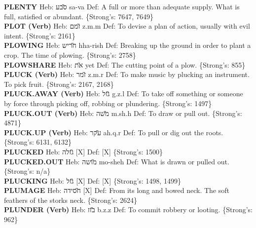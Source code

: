 {\textbf{PLENTY} Heb: {\large\H סבע} sa-va Def: A full or more than adequate supply. What is full, satisfied or abundant. \{Strong's: 7647, 7649\}\hfill{}\\

\textbf{PLOT (Verb)} Heb: {\large\H זמם} z.m.m Def: To devise a plan of action, usually with evil intent. \{Strong's: 2161\}\hfill{}\\

\textbf{PLOWING} Heb: {\large\H חריש} hha-rish Def: Breaking up the ground in order to plant a crop. The time of plowing. \{Strong's: 2758\}\hfill{}\\

\textbf{PLOWSHARE} Heb: {\large\H את} yet Def: The cutting point of a plow. \{Strong's: 855\}\hfill{}\\

\textbf{PLUCK (Verb)} Heb: {\large\H זמר} z.m.r Def: To make music by plucking an instrument. To pick fruit. \{Strong's: 2167, 2168\}\hfill{}\\

\textbf{PLUCK.AWAY (Verb)} Heb: {\large\H גזל} g.z.l Def: To take off something or someone by force through picking off, robbing or plundering. \{Strong's: 1497\}\hfill{}\\

\textbf{PLUCK.OUT (Verb)} Heb: {\large\H משה} m.sh.h Def: To draw or pull out. \{Strong's: 4871\}\hfill{}\\

\textbf{PLUCK.UP (Verb)} Heb: {\large\H עקר} ah.q.r Def: To pull or dig out the roots. \{Strong's: 6131, 6132\}\hfill{}\\

\textbf{PLUCKED} Heb: {\large\H גזלה} {[}X{]} Def: {[}X{]} \{Strong's: 1500\}\hfill{}\\

\textbf{PLUCKED.OUT} Heb: {\large\H מושה} mo-sheh Def: What is drawn or pulled out. \{Strong's: n/a\}\hfill{}\\

\textbf{PLUCKING} Heb: {\large\H גזל} {[}X{]} Def: {[}X{]} \{Strong's: 1498, 1499\}\hfill{}\\

\textbf{PLUMAGE} Heb: {\large\H חסידה} {[}X{]} Def: From its long and bowed neck. The soft feathers of the storks neck. \{Strong's: 2624\}\hfill{}\\

\textbf{PLUNDER (Verb)} Heb: {\large\H בזז} b.z.z Def: To commit robbery or looting. \{Strong's: 962\}\hfill{}\\

}
